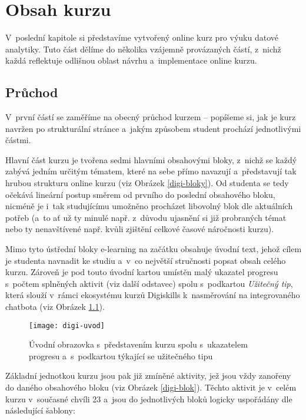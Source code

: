\hypertarget{obsah-kurzu}{%
\chapter{Obsah kurzu}\label{obsah-kurzu}}

V~poslední kapitole si představíme vytvořený online kurz pro výuku datové analytiky. Tuto část dělíme do několika vzájemně provázaných částí, z~nichž každá reflektuje odlišnou oblast návrhu a~implementace online kurzu.

\hypertarget{prux16fchod}{%
\section{Průchod}\label{prux16fchod}}

V~první částí se zaměříme na obecný průchod kurzem -- popíšeme si, jak je kurz navržen po strukturální stránce a~jakým způsobem student prochází jednotlivými částmi.

Hlavní část kurzu je tvořena sedmi hlavními obsahovými bloky, z~nichž se každý zabývá jedním určitým tématem, které na sebe přímo navazují a~představují tak hrubou strukturu online kurzu (viz Obrázek \ref{digi-bloky}). Od studenta se tedy očekává lineární postup směrem od prvního do poslední obsahového bloku, nicméně je i~tak studujícímu umožněno procházet libovolný blok dle aktuálních potřeb (a~to ať už ty minulé např. z~důvodu ujasnění si již probraných témat nebo ty nenavštívené např. kvůli zjištění celkové časové náročnosti kurzu).

Mimo tyto ústřední bloky e-learning na začátku obsahuje úvodní text, jehož cílem je studenta navnadit ke studiu a~v~co největší stručnosti popsat obsah celého kurzu. Zároveň je pod touto úvodní kartou umístěn malý ukazatel progresu s~počtem splněných aktivit (viz další odstavec) spolu s~podkartou \emph{Užitečný tip}, která slouží v~rámci ekosystému kurzů Digiskills k~nasměrování na integrovaného chatbota (viz Obrázek \ref{digi-uvod}).

\begin{figure}[ht]   
    \centering
    \texttt{[image: digi-uvod]}  
    \caption{Úvodní obrazovka s~představením kurzu spolu s~ukazatelem progresu a~s~podkartou týkající se užitečného tipu}
    \label{digi-uvod}
\end{figure}

Základní jednotkou kurzu jsou pak již zmíněné aktivity, jež jsou vždy zanořeny do daného obsahového bloku (viz Obrázek \ref{digi-blok}). Těchto aktivit je v~celém kurzu v~současné chvíli 23 a~jsou do jednotlivých bloků logicky uspořádány dle následující šablony:

